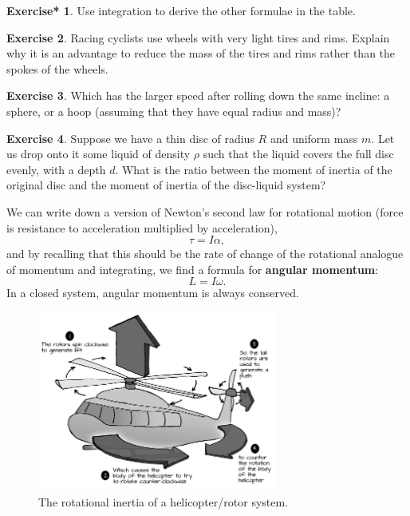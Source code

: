 \documentclass[a4paper]{amsbook}
\theoremstyle{definition}
\newtheorem{exercise}{Exercise}
\numberwithin{exercise}{chapter}
\newtheorem{exercise*}[exercise]{Exercise*}
\numberwithin{exercise}{chapter}
\begin{document}
\begin{exercise*}
  Use integration to derive the other formulae in the table.
\end{exercise*}

\begin{exercise}
  Racing cyclists use wheels with very light tires and rims. Explain why it is an advantage to reduce the mass of
  the tires and rims rather than the spokes of the wheels.
\end{exercise}

\begin{exercise}
  Which has the larger speed after rolling down the same incline: a sphere, or a hoop (assuming that they have equal radius and mass)?
\end{exercise}

\begin{exercise}
  Suppose we have a thin disc of radius $ R $ and uniform mass $ m $. Let us drop onto it some liquid of density $ \rho $ such that
  the liquid covers the full disc evenly, with a depth $ d $. What is the ratio between the moment of inertia of the original disc
  and the moment of inertia of the disc-liquid system?
\end{exercise}

We can write down a version of Newton's second law for rotational motion (force is resistance to acceleration multiplied by acceleration),
\begin{equation}
  \tau = I \alpha,
\end{equation}
and by recalling that this should be the rate of change of the rotational analogue of momentum and integrating,
we find a formula for \textbf{angular momentum}:
\begin{equation}
  L = I\omega.
\end{equation}
In a closed system, angular momentum is always conserved.

\begin{figure}
  \centering
  \includegraphics[width=0.7\textwidth]{helicopter}
  \caption{The rotational inertia of a helicopter/rotor system.\label{fig:helicopter}}
\end{figure}
\end{document}
